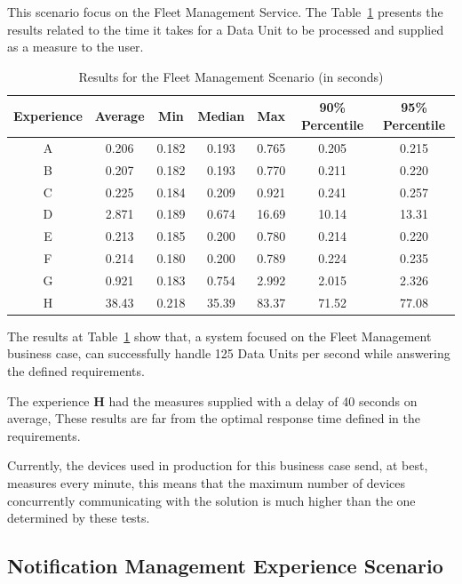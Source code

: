This scenario focus on the Fleet Management Service. The Table~\ref{tab:evaluation:experiences:fleet:results} presents the results related to the time it takes for a Data Unit to be processed and supplied as a measure to the user.

\begin{table}[H]
    \caption{Results for the Fleet Management Scenario (in seconds)}
    \label{tab:evaluation:experiences:fleet:results}
    \centering
    \begin{tabular}{@{}ccccccc@{}}
    \toprule
    \textbf{Experience} & \textbf{Average} & \textbf{Min} & \textbf{Median} & \textbf{Max} & \textbf{90\% Percentile} & \textbf{95\% Percentile} \\ \midrule
    A & 0.206 & 0.182 & 0.193 & 0.765 & 0.205 & 0.215 \\ \midrule
    B & 0.207 & 0.182 & 0.193 & 0.770 & 0.211 & 0.220 \\ \midrule
    C & 0.225 & 0.184 & 0.209 & 0.921 & 0.241 & 0.257 \\ \midrule
    D & 2.871 & 0.189 & 0.674 & 16.69 & 10.14 & 13.31 \\ \midrule
    E & 0.213 & 0.185 & 0.200 & 0.780 & 0.214 & 0.220 \\ \midrule
    F & 0.214 & 0.180 & 0.200 & 0.789 & 0.224 & 0.235 \\ \midrule
    G & 0.921 & 0.183 & 0.754 & 2.992 & 2.015 & 2.326 \\ \midrule
    H & 38.43 & 0.218 & 35.39 & 83.37 & 71.52 & 77.08 \\ \bottomrule
    \end{tabular}
\end{table}

The results at Table~\ref{tab:evaluation:experiences:fleet:results} show that, a system focused on the Fleet Management business case, can successfully handle 125 Data Units per second while answering the defined requirements.

The experience \textbf{H} had the measures supplied with a delay of 40 seconds on average, These results are far from the optimal response time defined in the requirements.

Currently, the devices used in production for this business case send, at best, measures every minute, this means that the maximum number of devices concurrently communicating with the solution is much higher than the one determined by these tests.

\subsection{Notification Management Experience Scenario}
\label{subsec:evaluation:experiences:notification}

